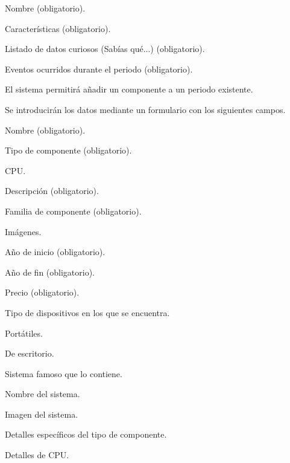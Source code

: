 \begin{myEnumRFA}
\begin{myEnumRFA}
		\begin{myEnumRFA}
			\item Nombre (obligatorio).
			\item Características (obligatorio).
			\item Listado de datos curiosos (Sabías qué...) (obligatorio).
			\item Eventos ocurridos durante el periodo (obligatorio).
		\end{myEnumRFA}
	\end{myEnumRFA}
	\item El sistema permitirá añadir un componente a un periodo existente.
	\begin{myEnumRFA}
		\item\label{it:campos_comp} Se introducirán los datos mediante un formulario con los siguientes campos.
		\begin{myEnumRFA}
			\item Nombre (obligatorio).
			\item Tipo de componente (obligatorio).
			\begin{myEnumRFA}
				\item CPU.
			\end{myEnumRFA}
			\item Descripción (obligatorio).
			\item Familia de componente (obligatorio).
			\item Imágenes.
			\item Año de inicio (obligatorio).
			\item Año de fin (obligatorio).
			\item Precio (obligatorio).
			\item Tipo de dispositivos en los que se encuentra.
			\begin{myEnumRFA}
				\item Portátiles.
				\item De escritorio.
			\end{myEnumRFA}
			\item Sistema famoso que lo contiene.
			\begin{myEnumRFA}
				\item Nombre del sistema.
				\item Imagen del sistema.
			\end{myEnumRFA}
			\item Detalles específicos del tipo de componente.
			\begin{myEnumRFA}
				\item Detalles de CPU.
				\begin{myEnumRFA}

\end{myEnumRFA}
\end{myEnumRFA}
\end{myEnumRFA}
\end{myEnumRFA}
\end{myEnumRFA}

